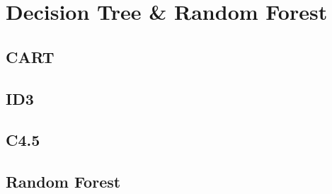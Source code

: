 
\chapter{Decision Tree \& Random Forest}
\label{chapter9}

\section{CART}

\section{ID3}

\section{C4.5}

\section{Random Forest}